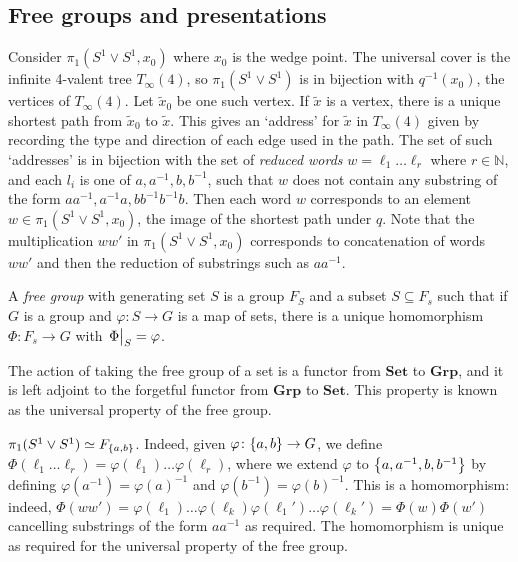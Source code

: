 \subsection{Free groups and presentations}
Consider \( \pi_1(S^1 \vee S^1, x_0) \) where \( x_0 \) is the wedge point.
The universal cover is the infinite 4-valent tree \( T_\infty(4) \), so \( \pi_1(S^1 \vee S^1) \) is in bijection with \( q^{-1}(x_0) \), the vertices of \( T_\infty(4) \).
Let \( \widetilde x_0 \) be one such vertex.
If \( \widetilde x \) is a vertex, there is a unique shortest path from \( \widetilde x_0 \) to \( \widetilde x \).
This gives an `address' for \( \widetilde x \) in \( T_\infty(4) \) given by recording the type and direction of each edge used in the path.
The set of such `addresses' is in bijection with the set of \emph{reduced words} \( w = \ell_1 \dots \ell_r \) where \( r \in \mathbb N \), and each \( l_i \) is one of \( a, a^{-1}, b, b^{-1} \), such that \( w \) does not contain any substring of the form \( aa^{-1}, a^{-1}a, bb^{-1} b^{-1}b \).
Then each word \( w \) corresponds to an element \( w \in \pi_1(S^1 \vee S^1, x_0) \), the image of the shortest path under \( q \).
Note that the multiplication \( ww' \) in \( \pi_1(S^1 \vee S^1, x_0) \) corresponds to concatenation of words \( ww' \) and then the reduction of substrings such as \( aa^{-1} \).
\begin{definition}
    A \emph{free group} with generating set \( S \) is a group \( F_S \) and a subset \( S \subseteq F_s \) such that if \( G \) is a group and \( \varphi \colon S \to G \) is a map of sets, there is a unique homomorphism \( \Phi \colon F_s \to G \) with \( \eval{\Phi}_S = \varphi \).
    \begin{center}
    \end{center}
\end{definition}
\begin{remark}
    The action of taking the free group of a set is a functor from \( \mathbfup{Set} \) to \( \mathbfup{Grp} \), and it is left adjoint to the forgetful functor from \( \mathbfup{Grp} \) to \( \mathbfup{Set} \).
    This property is known as the universal property of the free group.
\end{remark}
\begin{example}
    \( \pi_1(S^1 \vee S^1) \simeq F_{\qty{a,b}} \).
    Indeed, given \( \varphi \colon \qty{a,b} \to G \), we define \( \Phi(\ell_1 \dots \ell_r) = \varphi(\ell_1) \dots \varphi(\ell_r) \), where we extend \( \varphi \) to \( \qty{a, a^{-1}, b, b^{-1}} \) by defining \( \varphi(a^{-1}) = \varphi(a)^{-1} \) and \( \varphi(b^{-1}) = \varphi(b)^{-1} \).
    This is a homomorphism: indeed, \( \Phi(ww') = \varphi(\ell_1) \dots \varphi(\ell_k) \varphi(\ell_1') \dots \varphi(\ell_k') = \Phi(w)\Phi(w') \) cancelling substrings of the form \( aa^{-1} \) as required.
	The homomorphism is unique as required for the universal property of the free group.
\end{example}
